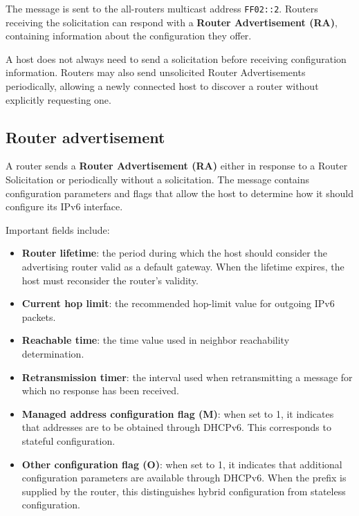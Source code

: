 The message is sent to the all-routers multicast address
\texttt{FF02::2}. Routers receiving the solicitation can respond
with a \textbf{Router Advertisement (RA)}, containing information
about the configuration they offer.

A host does not always need to send a solicitation before receiving
configuration information. Routers may also send unsolicited Router
Advertisements periodically, allowing a newly connected host to
discover a router without explicitly requesting one.


\begin{center}
\end{center}

\subsection{Router advertisement}

A router sends a \textbf{Router Advertisement (RA)} either in response
to a Router Solicitation or periodically without a solicitation.
The message contains configuration parameters and flags that allow
the host to determine how it should configure its IPv6 interface.

Important fields include:

\begin{itemize}
	\item \textbf{Router lifetime}: the period during which the host
	should consider the advertising router valid as a default gateway.
	When the lifetime expires, the host must reconsider the router's
	validity.
	\item \textbf{Current hop limit}: the recommended hop-limit value
	for outgoing IPv6 packets.
	\item \textbf{Reachable time}: the time value used in neighbor
	reachability determination.
	\item \textbf{Retransmission timer}: the interval used when
	retransmitting a message for which no response has been received.
	\item \textbf{Managed address configuration flag (M)}: when set to
	1, it indicates that addresses are to be obtained through DHCPv6.
	This corresponds to stateful configuration.
	\item \textbf{Other configuration flag (O)}: when set to 1, it
	indicates that additional configuration parameters are available
	through DHCPv6. When the prefix is supplied by the router, this
	distinguishes hybrid configuration from stateless configuration.
\end{itemize}

